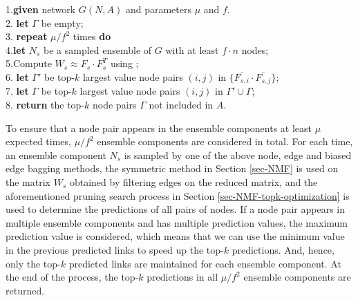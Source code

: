 \vspace{-1ex}
\begin{tabbing}1.\hspace{1ex}\=
 {\bf given} network $G(N, A)$ and parameters $\mu$ and $f$.\\
2.\> {\bf let} $\Gamma$ be empty;\\
3.\> {\bf repeat} $\mu/f^2$  times {\bf do} \\
4.\>\hspace{2ex}\= {\bf let} $N_s$ be a sampled ensemble of $G$ with at least $f\cdot n$ nodes; \\
5.\>\>Compute $W_s \approx F_s\cdot F_s^T$ using \NMF; \\
6.\>\> {\bf let} $\Gamma'$ be top-$k$ largest value node pairs $(i,j)$ in $\{\overline{F_{s,i}} \cdot \overline{F_{s,j}}\}$;\\
7.\>\> {\bf let} $\Gamma$ be top-$k$ largest value node pairs $(i,j)$ in $\Gamma'\cup\Gamma$;\\
8.\> {\bf return} the top-$k$ node pairs $\Gamma$ not included in $A$.
\end{tabbing}
\vspace{-1ex}


To ensure that a node pair appears in the ensemble components at least $\mu$ expected times,  $\mu / f^{2}$ ensemble components are considered in total.
For each time, an ensemble component $N_s$ is sampled by one of the above
node, edge and biased edge bagging methods, the symmetric \NMF method in Section \ref{sec-NMF} is used on the matrix $W_s$ obtained
by filtering edges on the reduced matrix, and the aforementioned
pruning search process in Section \ref{sec-NMF-topk-optimization} is used to determine the predictions of
all pairs of nodes. If a node pair appears in multiple ensemble components and has multiple
prediction values, the maximum prediction value is considered, which means that we can use the
minimum value in the previous predicted links to speed up the top-$k$ predictions.
And, hence, only the top-$k$ predicted links are maintained for each ensemble component.
At the end of the process, the top-$k$ predictions in all $\mu / f^{2}$ ensemble components are returned.




